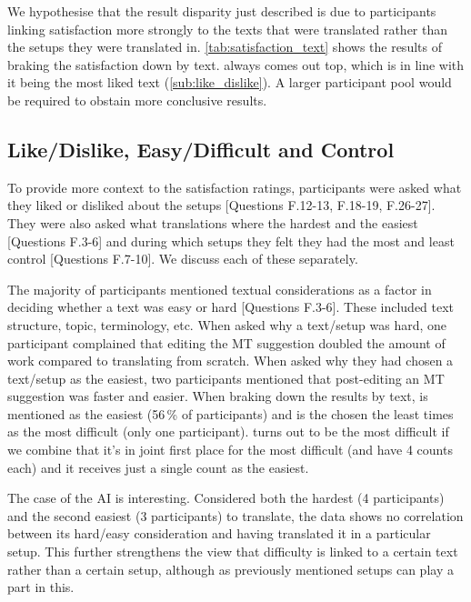 We hypothesise that the result disparity just described is due to participants linking satisfaction more strongly to the texts that were translated rather than the setups they were translated in. \autoref{tab:satisfaction_text} shows the results of braking the satisfaction down by text. \garfield always comes out top, which is in line with it being the most liked text (\autoref{sub:like_dislike}). A larger participant pool would be required to obstain more conclusive results.

\subsection{Like/Dislike, Easy/Difficult and Control}
\label{sub:like_dislike}

\noindent To provide more context to the satisfaction ratings, participants were asked what they liked or disliked about the setups [Questions F.12-13, F.18-19, F.26-27]. They were also asked what translations where the hardest and the easiest [Questions F.3-6] and during which setups they felt they had the most and least control [Questions F.7-10]. We discuss each of these separately.

The majority of participants mentioned textual considerations as a factor in deciding whether a text was easy or hard [Questions F.3-6]. These included text structure, topic, terminology, etc. When asked why a text/setup was hard, one participant complained that editing the \ac{MT} suggestion doubled the amount of work compared to translating from scratch. When asked why they had chosen a text/setup as the easiest, two participants mentioned that post-editing an \ac{MT} suggestion was faster and easier. When braking down the results by text, \garfield is mentioned as the easiest (56\,\% of participants) and is the chosen the least times as the most difficult (only one participant). \charlotte turns out to be the most difficult if we combine that it's in joint first place for the most difficult (\ai and \charlotte have 4 counts each) and it receives just a single count as the easiest.

The case of the AI is interesting. Considered both the hardest (4 participants) and the second easiest (3 participants) to translate, the data shows no correlation between its hard/easy consideration and having translated it in a particular setup. This further strengthens the view that difficulty is linked to a certain text rather than a certain setup, although as previously mentioned setups can play a part in this.

